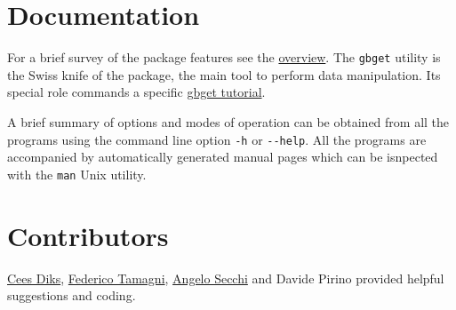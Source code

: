 \documentclass[11pt]{article}
\begin{document}
\section{Documentation}
\label{sec-2}

For a brief survey of the package features see the \href{http://cafim.sssup.it/~giulio/software/gbutils/overview.html}{overview}. The
\texttt{gbget} utility is the Swiss knife of the package, the main tool to
perform data manipulation. Its special role commands a specific \href{http://cafim.sssup.it/~giulio/software/gbutils/gbget.html}{gbget
tutorial}.

A brief summary of options and modes of operation can be obtained from
all the programs using the command line option \verb~-h~ or \verb~--help~. All
the programs are accompanied by automatically generated manual pages
which can be isnpected with the \texttt{man} Unix utility.
\section{Contributors}
\label{sec-3}

\href{http://www1.fee.uva.nl/cendef/whoiswho/showHP/default.asp?pID=6&selected=pi}{Cees Diks}, \href{http://www.cafed.sssup.it/~federico/}{Federico Tamagni}, \href{http://cafim.sssup.it/~angelo/}{Angelo Secchi} and Davide Pirino provided
helpful suggestions and coding.
\end{document}
